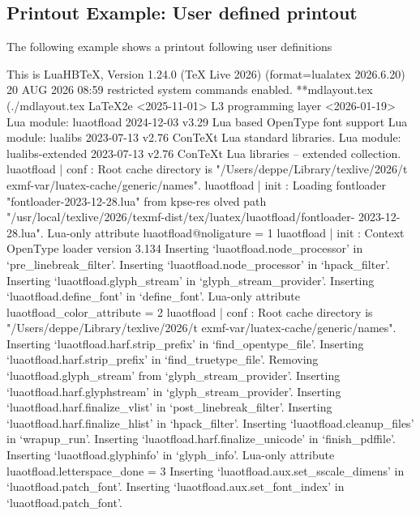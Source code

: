 \documentclass[
11pt,
a4paper,
oneside
]{scrbook}
\begin{document}
\subsection{Printout Example: User defined printout}
The following example shows a printout following user definitions 




\begin{Printout}[
	form=blue,
	paperheight=999,
	bandlines=2,
	feedlines=0,
	fitcolumns=132,
	linenumbers=true,
	punchholes=false,
	fontsize=\scriptsize
	]
This is LuaHBTeX, Version 1.24.0 (TeX Live 2026)  (format=lualatex 2026.6.20)  20 AUG 2026 08:59
restricted system commands enabled.
**mdlayout.tex
(./mdlayout.tex
LaTeX2e <2025-11-01>
L3 programming layer <2026-01-19>
Lua module: luaotfload 2024-12-03 v3.29 Lua based OpenType font support
Lua module: lualibs 2023-07-13 v2.76 ConTeXt Lua standard libraries.
Lua module: lualibs-extended 2023-07-13 v2.76 ConTeXt Lua libraries -- extended 
collection.
luaotfload | conf : Root cache directory is "/Users/deppe/Library/texlive/2026/t
exmf-var/luatex-cache/generic/names".
luaotfload | init : Loading fontloader "fontloader-2023-12-28.lua" from kpse-res
olved path "/usr/local/texlive/2026/texmf-dist/tex/luatex/luaotfload/fontloader-
2023-12-28.lua".
Lua-only attribute luaotfload@noligature = 1
luaotfload | init : Context OpenType loader version 3.134
Inserting `luaotfload.node_processor' in `pre_linebreak_filter'.
Inserting `luaotfload.node_processor' in `hpack_filter'.
Inserting `luaotfload.glyph_stream' in `glyph_stream_provider'.
Inserting `luaotfload.define_font' in `define_font'.
Lua-only attribute luaotfload_color_attribute = 2
luaotfload | conf : Root cache directory is "/Users/deppe/Library/texlive/2026/t
exmf-var/luatex-cache/generic/names".
Inserting `luaotfload.harf.strip_prefix' in `find_opentype_file'.
Inserting `luaotfload.harf.strip_prefix' in `find_truetype_file'.
Removing  `luaotfload.glyph_stream' from `glyph_stream_provider'.
Inserting `luaotfload.harf.glyphstream' in `glyph_stream_provider'.
Inserting `luaotfload.harf.finalize_vlist' in `post_linebreak_filter'.
Inserting `luaotfload.harf.finalize_hlist' in `hpack_filter'.
Inserting `luaotfload.cleanup_files' in `wrapup_run'.
Inserting `luaotfload.harf.finalize_unicode' in `finish_pdffile'.
Inserting `luaotfload.glyphinfo' in `glyph_info'.
Lua-only attribute luaotfload.letterspace_done = 3
Inserting `luaotfload.aux.set_sscale_dimens' in `luaotfload.patch_font'.
Inserting `luaotfload.aux.set_font_index' in `luaotfload.patch_font'.

\end{Printout}
\end{document}
